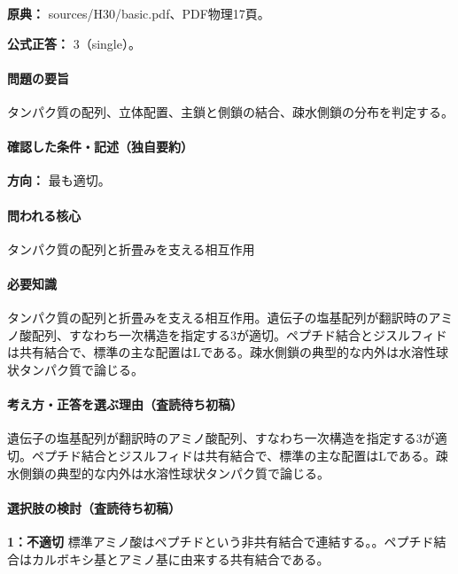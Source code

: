 \noindent\textbf{原典：} sources/H30/basic.pdf、PDF物理17頁。

\textbf{公式正答：} 3（single）。

\paragraph{問題の要旨} タンパク質の配列、立体配置、主鎖と側鎖の結合、疎水側鎖の分布を判定する。

\paragraph{確認した条件・記述（独自要約）}\mbox{}\par

\noindent\textbf{方向：} 最も適切。\par

\paragraph{問われる核心} タンパク質の配列と折畳みを支える相互作用

\paragraph{必要知識} タンパク質の配列と折畳みを支える相互作用。遺伝子の塩基配列が翻訳時のアミノ酸配列、すなわち一次構造を指定する3が適切。ペプチド結合とジスルフィドは共有結合で、標準の主な配置はLである。疎水側鎖の典型的な内外は水溶性球状タンパク質で論じる。

\paragraph{考え方・正答を選ぶ理由（査読待ち初稿）} 遺伝子の塩基配列が翻訳時のアミノ酸配列、すなわち一次構造を指定する3が適切。ペプチド結合とジスルフィドは共有結合で、標準の主な配置はLである。疎水側鎖の典型的な内外は水溶性球状タンパク質で論じる。

\paragraph{選択肢の検討（査読待ち初稿）}\mbox{}\par

\noindent\textbf{1：不適切} 標準アミノ酸はペプチドという非共有結合で連結する。。ペプチド結合はカルボキシ基とアミノ基に由来する共有結合である。\par

